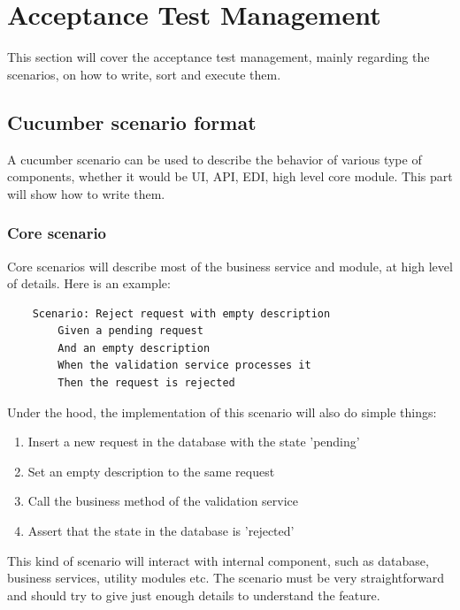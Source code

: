 \section{Acceptance Test Management}\label{sec:acceptance-test-management}

This section will cover the acceptance test management, mainly regarding the
scenarios, on how to write, sort and execute them.

\subsection{Cucumber scenario format}\label{subsec:cucumber-scenario-management}
A cucumber scenario can be used to describe the behavior of various type of
components, whether it would be UI, API, EDI, high level core module.
This part will show how to write them.

\subsubsection{Core scenario}
Core scenarios will describe most of the business service and module, at high
level of details.
Here is an example:

\begin{verbatim}
    Scenario: Reject request with empty description
        Given a pending request
        And an empty description
        When the validation service processes it
        Then the request is rejected
\end{verbatim}

Under the hood, the implementation of this scenario will also do simple things:
\begin{enumerate}
    \item Insert a new request in the database with the state 'pending'
    \item Set an empty description to the same request
    \item Call the business method of the validation service
    \item Assert that the state in the database is 'rejected'
\end{enumerate}

This kind of scenario will interact with internal component, such as
database, business services, utility modules etc.
The scenario must be very straightforward and should try to give just enough
details to understand the feature.


